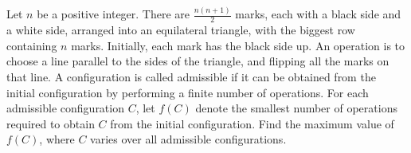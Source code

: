 Let $n$ be a positive integer.  There are $\tfrac{n(n+1)}{2}$ marks, each with a black side and a white side, arranged into an equilateral triangle, with the biggest row containing $n$ marks.  Initially, each mark has the black side up.  An operation is to choose a line parallel to the sides of the triangle, and flipping all the marks on that line.  A configuration is called admissible  if it can be obtained from the initial configuration by performing a finite number of operations.  For each admissible configuration $C$,  let $f(C)$ denote the smallest number of operations required to obtain $C$ from the initial configuration.  Find the maximum value of $f(C)$,  where $C$ varies over all admissible configurations.